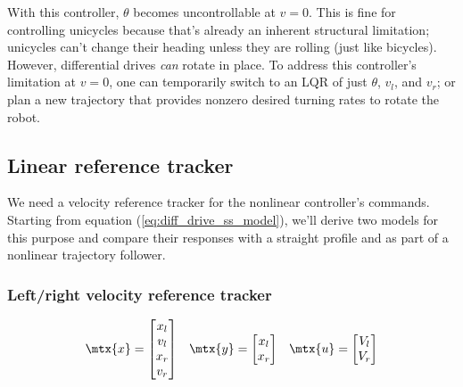 With this \gls{controller}, $\theta$ becomes uncontrollable at $v = 0$. This is
fine for controlling unicycles because that's already an inherent structural
limitation; unicycles can't change their heading unless they are rolling (just
like bicycles). However, differential drives \textit{can} rotate in place. To
address this controller's limitation at $v = 0$, one can temporarily switch to
an LQR of just $\theta$, $v_l$, and $v_r$; or plan a new trajectory that
provides nonzero desired turning rates to rotate the robot.

\subsection{Linear reference tracker}
\label{subsec:linear_reference_tracker}

We need a velocity \gls{reference} tracker for the nonlinear \gls{controller}'s
commands. Starting from equation (\ref{eq:diff_drive_ss_model}), we'll derive
two \glspl{model} for this purpose and compare their responses with a straight
profile and as part of a nonlinear trajectory follower.

\subsubsection{Left/right velocity reference tracker}

\begin{equation*}
  \begin{array}{ccc}
    \mtx{x} =
    \begin{bmatrix}
      x_l \\
      v_l \\
      x_r \\
      v_r
    \end{bmatrix} &
    \mtx{y} =
    \begin{bmatrix}
      x_l \\
      x_r
    \end{bmatrix} &
    \mtx{u} =
    \begin{bmatrix}
      V_l \\
      V_r
    \end{bmatrix}
  \end{array}
\end{equation*}

